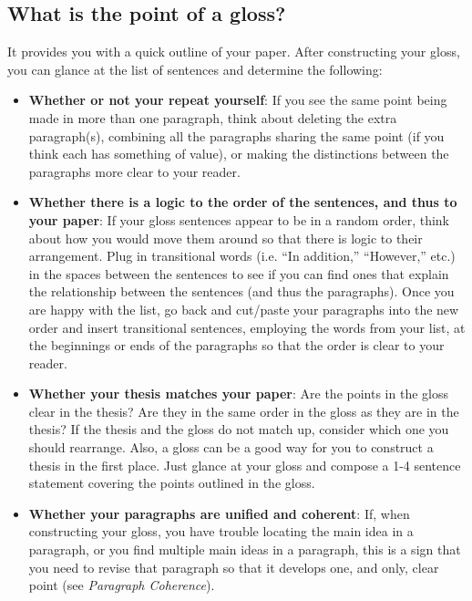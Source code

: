   	        
\subsection{What is the point of a gloss?}

It provides you with a quick outline of your paper. After constructing your gloss, you can glance at the list of sentences and determine the following:
 \begin{itemize}
        
\item \textbf{Whether or not your repeat yourself}: If you see the same point being made in 
more than one paragraph, think about deleting the extra paragraph(s), 
combining all the paragraphs sharing the same point (if you think each has 
something of value), or making the distinctions between the paragraphs more 
clear to your reader.
        
\item \textbf{Whether there is a logic to the order of the sentences, and thus to your paper}:
If your gloss sentences appear to be in a random order, think about how you would move them around so that there is logic to their arrangement.  Plug in transitional words (i.e. “In addition,” “However,” etc.)  in the spaces between the sentences to see if you can find ones that explain the relationship between the sentences (and thus the paragraphs). Once you are happy with the list, go back and cut/paste your paragraphs into the new order and insert transitional sentences, employing the words from your list, at the beginnings or ends of the paragraphs so that the order is clear to your reader.

\item \textbf{Whether your thesis matches your paper}: Are the points in the gloss clear in the thesis? Are they in the same order in the gloss as they are in the thesis? If the thesis and the gloss do not match up, consider which one you should rearrange. Also, a gloss can be a good way for you to construct a thesis in the first place. Just glance at your gloss and compose a 1-4 sentence statement covering the points outlined in the gloss.

\item \textbf{Whether your paragraphs are unified and coherent}: If, when constructing your 
gloss, you have trouble locating the main idea in a paragraph, or you find multiple main ideas in a paragraph, this is a sign that you need to revise that paragraph so that it develops one, and only, clear point (see \emph{Paragraph Coherence}).
\end{itemize}